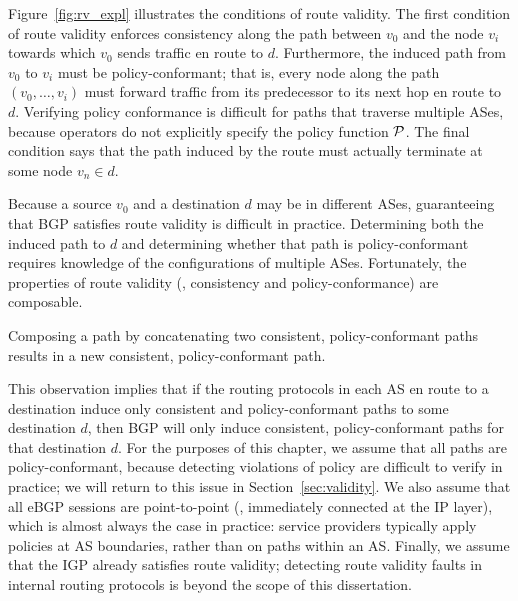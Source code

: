 Figure~\ref{fig:rv_expl} illustrates the conditions of route validity.
The first condition of route validity enforces consistency
along the path between $v_0$ and the node $v_i$ towards which $v_0$
sends traffic en route to $d$.
Furthermore, the induced path from $v_0$ to $v_i$ must be
policy-conformant; that is, every node along the path $(v_0, \ldots, v_i)$
must forward traffic from its predecessor to its next hop en route to
$d$.  Verifying policy conformance is difficult for
paths that traverse multiple ASes, because operators do not explicitly
specify the policy function $\P$.  The final condition says that the
path induced by the route must actually terminate at some node $v_n \in
d$.



Because a source $v_0$ and a destination $d$ may be in different ASes,
guaranteeing that BGP satisfies route validity is difficult in practice.
Determining both the induced path to $d$ and determining whether that
path is policy-conformant requires knowledge of the configurations of
multiple ASes.  Fortunately, the properties of route validity (\ie,
consistency and policy-conformance) are composable.

\begin{observation}\label{obs:composable}
Composing a path by concatenating two consistent, policy-conformant
paths results in a new consistent, policy-conformant path.
\end{observation}

This observation implies that if the routing protocols in each AS en
route to a destination induce only consistent and policy-conformant
paths to some destination $d$, then BGP will only induce consistent,
policy-conformant paths for that destination $d$.  For the purposes of
this chapter, we assume that all paths are policy-conformant, because
detecting violations of policy are difficult to verify in practice; we will
return to this issue in Section~\ref{sec:validity}.  We also assume that
all eBGP sessions are point-to-point (\ie, immediately connected at the
IP layer), which is almost always the case in practice: service
providers typically apply policies at AS boundaries, rather than on
paths within an AS.  Finally, we assume that the IGP already satisfies
route validity; detecting route validity faults in internal routing
protocols is beyond the scope of this dissertation.




